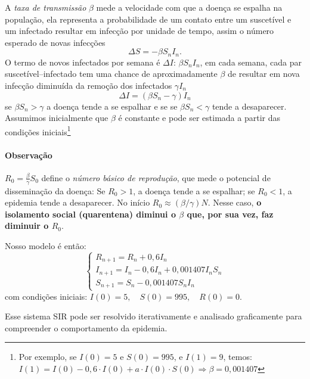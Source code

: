 \documentclass{article}
\begin{document}
A \textit{taxa de transmissão} $\beta$ mede a velocidade com que a
doença se espalha na população, ela representa a probabilidade de um
contato entre um suscetível e um infectado resultar em infecção por
unidade de tempo, assim o número esperado de novas infecções
\[
  \Delta S= - \beta S_n I_n.
\]
O termo de novos infectados por semana é $\Delta I$: $\beta S_n I_n$,
em cada semana, cada par suscetível–infectado tem uma chance de
aproximadamente $\beta$ de resultar em nova infecção diminuída da
remo\c{c}\~ao dos infectados $\gamma  I_n$
\begin{equation}
  \label{eq:taxainfeccao}
  \Delta I = (\beta S_n - \gamma)I_n
\end{equation}
se $\beta S_n > \gamma$ a doença tende a se espalhar e se se
$\beta S_n < \gamma$ tende a desaparecer. Assumimos inicialmente que
$\beta$ \'{e} constante e pode ser estimada a partir das
condi\c{c}\~oes iniciais\footnote{Por exemplo, se $I(0) = 5$ e
  $S(0) = 995$, e $I(1) = 9$, temos:
  $I(1) = I(0) - 0{,}6 \cdot I(0) + a \cdot I(0) \cdot S(0) \Rightarrow
  \beta = 0{,}001407$}

\paragraph{Observação}
$ R_0
= %
\frac{\beta}{\gamma}S_0$ define o \emph{número básico de reprodução},
que mede o potencial de disseminação da doença: Se $R_0 > 1$, a doença
tende a se espalhar; se $R_0 < 1$, a epidemia tende a desaparecer. No
início $R_0 \approx (\beta/\gamma)N$. Nesse caso, \textbf{o isolamento
  social (quarentena) diminui o $\beta$ que, por sua vez, faz diminuir
  o $R_0$}.

\medskip

Nosso modelo  \'{e} ent\~ao:
\[
  \begin{cases}
    R_{n+1} = R_n + 0{,}6 I_n \\
    I_{n+1} = I_n - 0{,}6 I_n + 0{,}001407 I_n S_n \\
    S_{n+1} = S_n - 0{,}001407 S_n I_n
  \end{cases}
\]
com condi\c{c}\~oes iniciais:
\( I(0) = 5, \quad S(0) = 995, \quad R(0) = 0 \).


Esse sistema SIR pode ser resolvido iterativamente e analisado
graficamente para compreender o comportamento da epidemia.
\end{document}

